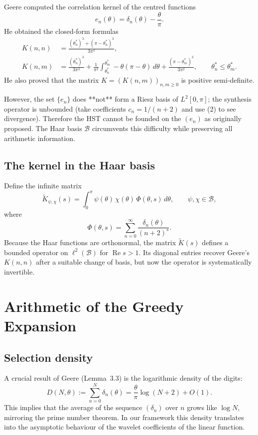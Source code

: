 \documentclass[11pt,a4paper]{article}
\theoremstyle{remark}
\begin{document}
Geere computed the correlation kernel of the centred functions
\[
e_n(\theta) = \delta_n(\theta) - \frac{\theta}{\pi}.
\]
He obtained the closed‑form formulas
\[
\begin{aligned}
K(n,n) &= \frac{(\theta_n^*)^3 + (\pi-\theta_n^*)^3}{3\pi^2},\\[4pt]
K(n,m) &= \frac{(\theta_n^*)^3}{3\pi^2}
         + \frac{1}{\pi^2}\int_{\theta_n^*}^{\theta_m^*} -\theta(\pi-\theta)\,d\theta
         + \frac{(\pi-\theta_m^*)^3}{3\pi^2},\qquad \theta_n^*\le\theta_m^*.
\end{aligned}
\tag{7}
\]
He also proved that the matrix \(K = (K(n,m))_{n,m\ge0}\) is positive semi‑definite.

However, the set \(\{e_n\}\) does **not** form a Riesz basis of \(L^2[0,\pi]\); the synthesis operator is unbounded (take coefficients \(c_n = 1/(n+2)\) and use (2) to see divergence). Therefore the HST cannot be founded on the \((e_n)\) as originally proposed. The Haar basis \(\mathcal{B}\) circumvents this difficulty while preserving all arithmetic information.

\subsection{The kernel in the Haar basis}

Define the infinite matrix
\[
\widetilde{K}_{\psi,\chi}(s) = \int_0^\pi \psi(\theta)\,\chi(\theta)\,\Phi(\theta,s)\,d\theta,\qquad \psi,\chi\in\mathcal{B},
\]
where
\[
\Phi(\theta,s) = \sum_{n=0}^\infty \frac{\delta_n(\theta)}{(n+2)^s}.
\]
Because the Haar functions are orthonormal, the matrix \(\widetilde{K}(s)\) defines a bounded operator on \(\ell^2(\mathcal{B})\) for \(\operatorname{Re}s>1\). Its diagonal entries recover Geere’s \(K(n,n)\) after a suitable change of basis, but now the operator is systematically invertible.

\section{Arithmetic of the Greedy Expansion}

\subsection{Selection density}

A crucial result of Geere (Lemma~3.3) is the logarithmic density of the digits:
\[
D(N,\theta) := \sum_{n=0}^N \delta_n(\theta) = \frac{\theta}{\pi}\log(N+2) + O(1).
\tag{8}
\]
This implies that the average of the sequence \((\delta_n)\) over \(n\) grows like \(\log N\), mirroring the prime number theorem. In our framework this density translates into the asymptotic behaviour of the wavelet coefficients of the linear function.
\end{document}
